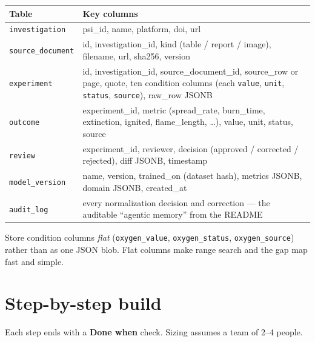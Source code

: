 \documentclass[11pt,a4paper]{article}
\newcommand{\code}[1]{\texttt{#1}}
\begin{document}
\begin{tabularx}{\linewidth}{@{}p{3.4cm} L@{}}
\toprule
\textbf{Table} & \textbf{Key columns}\\
\midrule
\code{investigation} & psi\_id, name, platform, doi, url\\
\code{source\_document} & id, investigation\_id, kind (table / report / image), filename, url, sha256, version\\
\code{experiment} & id, investigation\_id, source\_document\_id, source\_row or page, quote, ten condition columns (each \code{value}, \code{unit}, \code{status}, \code{source}), raw\_row JSONB\\
\code{outcome} & experiment\_id, metric (spread\_rate, burn\_time, extinction, ignited, flame\_length, \dots), value, unit, status, source\\
\code{review} & experiment\_id, reviewer, decision (approved / corrected / rejected), diff JSONB, timestamp\\
\code{model\_version} & name, version, trained\_on (dataset hash), metrics JSONB, domain JSONB, created\_at\\
\code{audit\_log} & every normalization decision and correction --- the auditable ``agentic memory'' from the README\\
\bottomrule
\end{tabularx}

\medskip
Store condition columns \emph{flat} (\code{oxygen\_value}, \code{oxygen\_status}, \code{oxygen\_source})
rather than as one JSON blob. Flat columns make range search and the gap map fast and simple.

\section{Step-by-step build}

Each step ends with a \textbf{Done when} check. Sizing assumes a team of 2--4 people.
\end{document}
